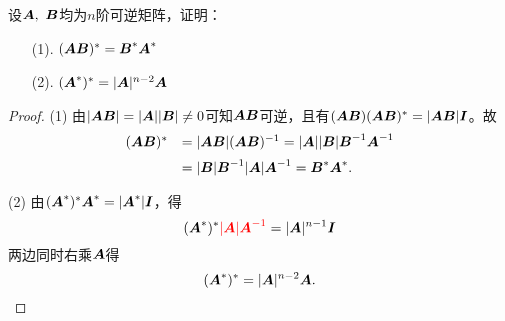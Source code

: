 \begin{li}
  设$\MA,~\MB$均为$n$阶可逆矩阵，证明：
  \begin{itemize}
  \item[(1).] $(\MA\MB)^*=\MB^*\MA^*$
  \item[(2).] $(\MA^*)^*=|\MA|^{n-2}\MA$ 
  \end{itemize}
\end{li}
\begin{proof}

(1) 由$|\MA\MB| = |\MA||\MB| \ne 0$可知$\MA\MB$可逆，且有$(\MA\MB)(\MA\MB)^*=|\MA\MB|\MI$。故
$$
\begin{array}{cl}
  (\MA\MB)^* &  =|\MA\MB| (\MA\MB)^{-1}
             = |\MA||\MB| \MB^{-1}\MA^{-1} \\[0.2cm]
           & \ds = |\MB| \MB^{-1} |\MA| \MA^{-1}   = \MB^*\MA^*.      
\end{array}
$$


(2) 由$(\MA^*)^* \MA^* = |\MA^*|\MI$，得 
$$(\MA^*)^* \red{|\MA|\MA^{-1}} = |\MA|^{n-1}\MI$$  
两边同时右乘$\MA$得
$$
(\MA^*)^*=|\MA|^{n-2}\MA.
$$
\end{proof}


